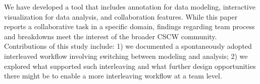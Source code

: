 We have developed a tool that includes annotation for data modeling, interactive
visualization for data analysis, and collaboration features. While this paper
reports a collaborative task in a specific domain, findings regarding team
process and breakdowns meet the interest of the broader CSCW community.
Contributions of this study include: 1) we documented a spontaneously adopted
interleaved workflow involving switching between modeling and analysis; 2) we
explored what supported such interleaving and what further design opportunities
there might be to enable a more interleaving workflow at a team level.
